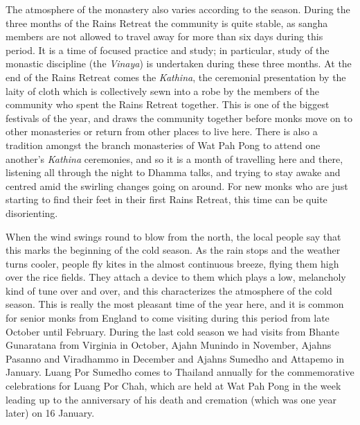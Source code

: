 The atmosphere of the monastery also varies according to the season.
During the three months of the Rains Retreat the community is quite
stable, as sangha members are not allowed to travel away for more than
six days during this period. It is a time of focused practice and study;
in particular, study of the monastic discipline (the \emph{Vinaya}) is
undertaken during these three months. At the end of the Rains Retreat
comes the \emph{Kathina}, the ceremonial presentation by the laity of
cloth which is collectively sewn into a robe by the members of the
community who spent the Rains Retreat together. This is one of the
biggest festivals of the year, and draws the community together before
monks move on to other monasteries or return from other places to live
here. There is also a tradition amongst the branch monasteries of Wat
Pah Pong to attend one another's \emph{Kathina} ceremonies, and so it is
a month of travelling here and there, listening all through the night to
Dhamma talks, and trying to stay awake and centred amid the swirling
changes going on around. For new monks who are just starting to find
their feet in their first Rains Retreat, this time can be quite
disorienting.

When the wind swings round to blow from the north, the local people say
that this marks the beginning of the cold season. As the rain stops and
the weather turns cooler, people fly kites in the almost continuous
breeze, flying them high over the rice fields. They attach a device to
them which plays a low, melancholy kind of tune over and over, and this
characterizes the atmosphere of the cold season. This is really the most
pleasant time of the year here, and it is common for senior monks from
England to come visiting during this period from late October until
February. During the last cold season we had visits from Bhante
Gunaratana from Virginia in October, Ajahn Munindo in November, Ajahns
Pasanno and Viradhammo in December and Ajahns Sumedho and Attapemo in
January. Luang Por Sumedho comes to Thailand annually for the
commemorative celebrations for Luang Por Chah, which are held at Wat Pah
Pong in the week leading up to the anniversary of his death and
cremation (which was one year later) on 16 January.

